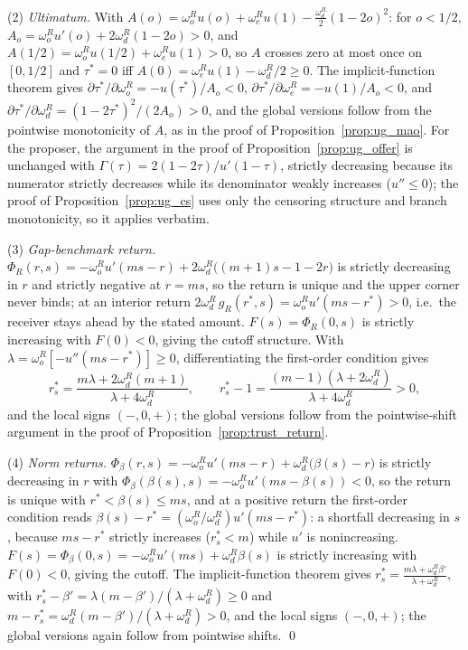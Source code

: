 \documentclass[11pt]{article}
\theoremstyle{plain}
\theoremstyle{remark}
\begin{document}
(2) \emph{Ultimatum.}  With $A(o)=\omega_o^R u(o)+\omega_e^R u(1)-\tfrac{\omega_d^R}2(1-2o)^2$: for $o<1/2$, $A_o=\omega_o^R u'(o)+2\omega_d^R(1-2o)>0$, and $A(1/2)=\omega_o^R u(1/2)+\omega_e^R u(1)>0$, so $A$ crosses zero at most once on $[0,1/2]$ and $\tau^\ast=0$ iff $A(0)=\omega_e^R u(1)-\omega_d^R/2\ge0$.  The implicit-function theorem gives $\partial\tau^\ast/\partial\omega_o^R=-u(\tau^\ast)/A_o<0$, $\partial\tau^\ast/\partial\omega_e^R=-u(1)/A_o<0$, and $\partial\tau^\ast/\partial\omega_d^R=(1-2\tau^\ast)^2/(2A_o)>0$, and the global versions follow from the pointwise monotonicity of $A$, as in the proof of Proposition~\ref{prop:ug_mao}.  For the proposer, the argument in the proof of Proposition~\ref{prop:ug_offer} is unchanged with $\Gamma(\tau)=2(1-2\tau)/u'(1-\tau)$, strictly decreasing because its numerator strictly decreases while its denominator weakly increases ($u''\le0$); the proof of Proposition~\ref{prop:ug_cs} uses only the censoring structure and branch monotonicity, so it applies verbatim.

(3) \emph{Gap-benchmark return.}  $\Phi_R(r,s)=-\omega_o^R u'(ms-r)+2\omega_d^R\big((m+1)s-1-2r\big)$ is strictly decreasing in $r$ and strictly negative at $r=ms$, so the return is unique and the upper corner never binds; at an interior return $2\omega_d^R\,g_R(r^\ast,s)=\omega_o^R u'(ms-r^\ast)>0$, i.e.\ the receiver stays ahead by the stated amount.  $F(s)=\Phi_R(0,s)$ is strictly increasing with $F(0)<0$, giving the cutoff structure.  With $\lambda=\omega_o^R[-u''(ms-r^\ast)]\ge0$, differentiating the first-order condition gives
\[
        r_s^\ast=\frac{m\lambda+2\omega_d^R(m+1)}{\lambda+4\omega_d^R},
        \qquad
        r_s^\ast-1=\frac{(m-1)(\lambda+2\omega_d^R)}{\lambda+4\omega_d^R}>0,
\]
and the local signs $(-,0,+)$; the global versions follow from the pointwise-shift argument in the proof of Proposition~\ref{prop:trust_return}.

(4) \emph{Norm returns.}  $\Phi_\beta(r,s)=-\omega_o^R u'(ms-r)+\omega_d^R\big(\beta(s)-r\big)$ is strictly decreasing in $r$ with $\Phi_\beta(\beta(s),s)=-\omega_o^R u'(ms-\beta(s))<0$, so the return is unique with $r^\ast<\beta(s)\le ms$, and at a positive return the first-order condition reads $\beta(s)-r^\ast=(\omega_o^R/\omega_d^R)u'(ms-r^\ast)$: a shortfall decreasing in $s$, because $ms-r^\ast$ strictly increases ($r_s^\ast<m$) while $u'$ is nonincreasing.  $F(s)=\Phi_\beta(0,s)=-\omega_o^R u'(ms)+\omega_d^R\beta(s)$ is strictly increasing with $F(0)<0$, giving the cutoff.  The implicit-function theorem gives $r_s^\ast=\frac{m\lambda+\omega_d^R\beta'}{\lambda+\omega_d^R}$, with $r_s^\ast-\beta'=\lambda(m-\beta')/(\lambda+\omega_d^R)\ge0$ and $m-r_s^\ast=\omega_d^R(m-\beta')/(\lambda+\omega_d^R)>0$, and the local signs $(-,0,+)$; the global versions again follow from pointwise shifts.
\qed
\end{document}
